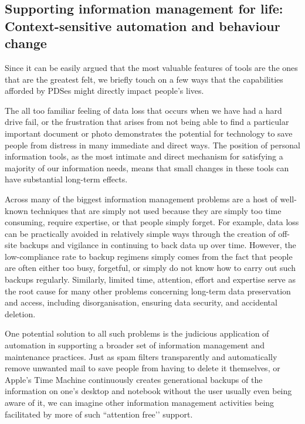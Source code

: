 \documentclass[graybox]{svmult}
\begin{document}
\subsection{Supporting information management for life: Context-sensitive automation and behaviour change}
Since it can be easily argued that the most valuable features of tools are the ones that are the greatest felt, we briefly touch on a few ways that the capabilities afforded by PDSes  might directly impact people’s lives.  

The all too familiar feeling of data loss that occurs when we have had a hard drive fail, or the frustration that arises from not being able to find a particular important document or photo demonstrates the potential for technology to save people from distress in many immediate and direct ways.  The position of personal information tools, as the most intimate and direct mechanism for satisfying a majority of our information needs, means that small changes in these tools can have substantial long-term effects.

Across many of the biggest information management problems are a host of well-known techniques that are simply not used because they are simply too time consuming, require expertise, or that people simply forget.  For example, data loss can be practically avoided in relatively simple ways through the creation of off-site backups and vigilance in continuing to back data up over time. However, the low-compliance rate to backup regimens simply comes from the fact that people are often either too busy, forgetful, or simply do not know how to carry out such backups regularly.  Similarly, limited time, attention, effort and expertise serve as the root cause for many other problems concerning long-term data preservation and access, including disorganisation, ensuring data security, and accidental deletion.

One potential solution to all such problems is the judicious application of automation in supporting a broader set of information management and maintenance practices.  Just as spam filters transparently and automatically remove unwanted mail to save people from having to delete it themselves, or Apple’s Time Machine continuously creates generational backups of the information on one’s desktop and notebook without the user usually even being aware of it, we can imagine other information management activities being facilitated by more of such ``attention free’’ support.  
\end{document}
